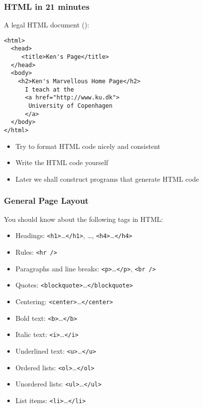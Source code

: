 \documentclass[dvipsnames]{beamer}
\begin{document}
\begin{frame}[fragile]
\frametitle{HTML in 21 minutes}

A legal HTML document ():

\begin{small}
\begin{verbatim}
<html>
  <head>
     <title>Ken's Page</title>
  </head>
  <body>
    <h2>Ken's Marvellous Home Page</h2>
      I teach at the
      <a href="http://www.ku.dk">
       University of Copenhagen
      </a>
  </body>
</html>
\end{verbatim}
\end{small}

\begin{itemize}
\item Try to format HTML code nicely and consistent

\item Write the HTML code yourself

\item Later we shall construct programs that generate HTML code
\end{itemize}

\end{frame}

\begin{frame}
\frametitle{General Page Layout}

You should know about the following tags in HTML:

\begin{itemize}
\item Headings: \texttt{<h1>}\ldots \texttt{</h1>}, \ldots, \texttt{<h4>}\ldots \texttt{</h4>}
\item Rules: \texttt{<hr />}
\item Paragraphs and line breaks: \texttt{<p>}\ldots \texttt{</p>},
  \texttt{<br />}
\item Quotes: \texttt{<blockquote>}\ldots \texttt{</blockquote>}
\item Centering: \texttt{<center>}\ldots \texttt{</center>}
\item Bold text: \texttt{<b>}\ldots \texttt{</b>}
\item Italic text: \texttt{<i>}\ldots \texttt{</i>}
\item Underlined text: \texttt{<u>}\ldots \texttt{</u>}
\item Ordered lists: \texttt{<ol>}\ldots \texttt{</ol>}
\item Unordered lists: \texttt{<ul>}\ldots \texttt{</ul>}
\item List items: \texttt{<li>}\ldots \texttt{</li>}
\end{itemize}
\end{frame}
\end{document}
